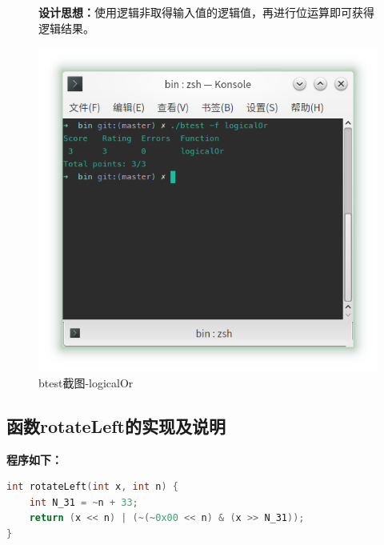 \begin{figure}[H]
\begin{minipage}[c]{0.5\linewidth}
\textbf{设计思想：}使用逻辑非取得输入值的逻辑值，再进行位运算即可获得逻辑结果。
		
\end{minipage}
\begin{minipage}[c]{0.4\linewidth}
\centering
\includegraphics[width=0.9\linewidth]{figures/logicalOr}
\caption{btest截图-logicalOr}
\label{fig:logicalOr}
\end{minipage}
\end{figure}

\subsection{函数rotateLeft的实现及说明}
\textbf{程序如下：}
	
\begin{lstlisting}[language = c]
int rotateLeft(int x, int n) {
    int N_31 = ~n + 33;
	return (x << n) | (~(~0x00 << n) & (x >> N_31));
}
\end{lstlisting}
	
